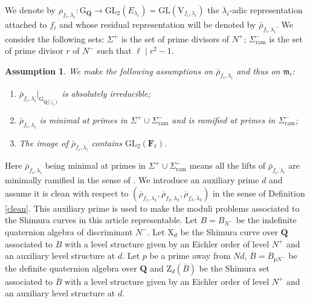 \documentclass[10pt]{amsart}
\numberwithin{equation}{section}
\theoremstyle{plain}
\numberwithin{equation}{section}
\newtheorem{ass}[thm]{Assumption}
\theoremstyle{definition}
\theoremstyle{remark}
\def\GL{\mathrm{GL}}
\def\frakm{\mathfrak{m}}
\def\ram{\mathrm{ram}}
\def\frakm{\mathfrak{m}}
\def\FF{\mathbf{F}}
\def\QQ{\mathbf{Q}}
\def\rmG{\mathrm{G}}
\def\rmX{\mathrm{X}}
\def\rmV{\mathrm{V}}
\def\rmZ{\mathrm{Z}}
\begin{document}
We denote by ${\rho}_{f_{i}, \lambda_{i}}: \rmG_{\QQ}\rightarrow \GL_{2}(E_{\lambda_{i}})=\GL(\rmV_{f_{i},\lambda_{i}})$ the $\lambda_{i}$-adic representation attached to $f_{i}$ and whose residual representation will be denoted by $\bar{\rho}_{f_{i}, \lambda_{i}}$.  We consider the following sets: $\Sigma^{+}$ is the set of prime divisors of $N^{+}$; $\Sigma^{-}_{\ram}$ is the set of prime divisor $r$ of $N^{-}$ such that $\ell \mid r^{2}-1$. 
\begin{ass}\label{intro-ass}
We make the following assumptions on $\bar{\rho}_{f_{i}, \lambda_{i}}$ and thus on $\frakm_{i}$:
\begin{enumerate}
\item  $\bar{\rho}_{f_{i}, \lambda_{i}}\vert_{\rmG_{\QQ(\zeta_{\ell})}}$ is absolutely irreducible;
\item  $\bar{\rho}_{f_{i}, \lambda_{i}}$ is minimal at primes in $\Sigma^{+}\cup\Sigma^{-}_{\ram}$ and is ramified at primes in $\Sigma^{-}_{\ram}$;
\item The image of $\bar{\rho}_{f_{i}, \lambda_{i}}$ contains $\GL_{2}(\FF_{\ell})$.
\end{enumerate}
\end{ass}

Here $\bar{\rho}_{f_{i}, \lambda_{i}}$ being minimal at primes in $\Sigma^{+}\cup\Sigma^{-}_{\ram}$ means all the lifts of  $\bar{\rho}_{f_{i}, \lambda_{i}}$ are minimally ramified in the sense of \cite[\S 29]{Maz}. We introduce an auxiliary prime $d$ and assume it is clean with respect to $(\overline{\rho}_{f_{1}, \lambda_{1}}, \overline{\rho}_{f_{2}, \lambda_{2}}, \overline{\rho}_{f_{3}, \lambda_{3}})$ in the sense of Definition \ref{clean}.  This auxiliary prime is used to make the moduli problems associated to the Shimura curves in this article representable. Let $B=B_{N^{-}}$ be the indefinite quaternion algebra of discriminant $N^{-}$. Let $\rmX_{d}$ be the Shimura curve over $\QQ$ associated to $B$ with a level structure given by an Eichler order of level $N^{+}$ and an auxiliary level structure at $d$. Let $p$ be a prime away from $Nd$, $\overline{B}=B_{pN^{-}}$ be the definite quaternion algebra over $\QQ$ and $\rmZ_{d}(\overline{B})$ be the Shimura set associated to $\overline{B}$ with a level structure given by an Eichler order of level $N^{+}$ and an auxiliary level structure at $d$. 
\end{document}
